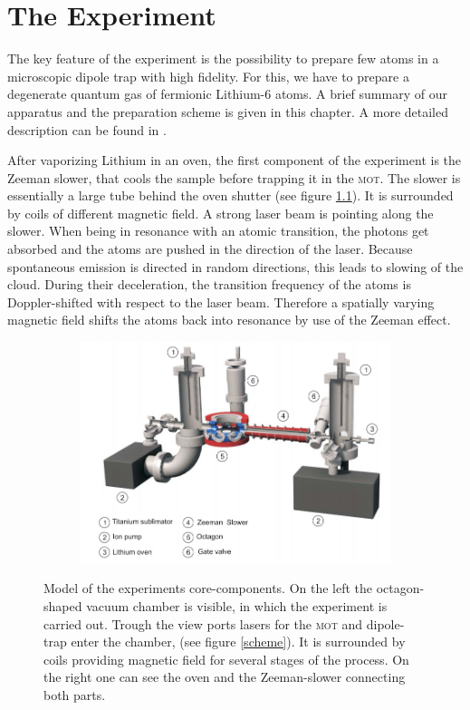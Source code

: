 \chapter{The Experiment}


The key feature of the experiment is the possibility to prepare few atoms in a microscopic dipole trap with high fidelity. For this, we have to prepare a degenerate quantum gas of fermionic Lithium-6 atoms. A brief summary of our apparatus and the preparation scheme is given in this chapter. A more detailed description can be found in \cite{friedhelm}. 

After vaporizing Lithium in an oven, the first component of the experiment is the Zeeman slower, that cools the sample before trapping it in the \textsc{mot}. The slower is essentially a large tube behind the oven shutter (see figure \ref{experiment}). It is surrounded by coils of different magnetic field. A strong laser beam is pointing along the slower. When being in resonance with an atomic transition, the photons get absorbed and the atoms are pushed in the direction of the laser. Because spontaneous emission is directed in random directions, this leads to slowing of the cloud. During their deceleration, the transition frequency of the atoms is Doppler-shifted with respect to the laser beam. Therefore a spatially varying magnetic field shifts the atoms back into resonance by use of the Zeeman effect. 
\begin{figure}[h]
\centering
\begin{subfigure}[b]{0.8\textwidth}
                \includegraphics[width=\textwidth]{exsetup}
\end{subfigure}
\caption{Model of the experiments core-components. On the left the octagon-shaped vacuum chamber is visible, in which the experiment is carried out. Trough the view ports lasers for the \textsc{mot} and dipole-trap enter the chamber, (see figure \ref{scheme}). It is surrounded by coils providing magnetic field for several stages of the process. On the right one can see the oven and the Zeeman-slower connecting both parts.}
\label{experiment}
\end{figure}

